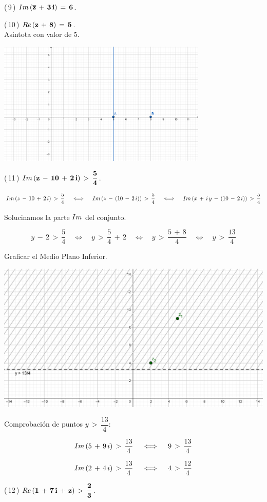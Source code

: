 \documentclass[a4paper,11pt,openany]{book}
\begin{document}
\textcolor{ao(english)}{(\,9\,)} $\bf{\mathnormal{Im}\,(\overline{z}\,+\,3\,i)\,=\,6}$.

\textcolor{ao(english)}{(\,10\,)} $\bf{\mathnormal{Re}\,(z\,+\,8)\,=\,5}$.\\

Asintota con valor de $5$.\\

\begin{center}
    \includegraphics[width=10cm]{Gra-Ej-10.png}
\end{center}

\textcolor{ao(english)}{(\,11\,)} $\bf{\mathnormal{Im}\,(z\,-\,10\,+\,2\,i)\,>\,\dfrac{5}{4}}$.

$$\mathnormal{Im}\,(z\,-\,10\,+\,2\,i)\,>\,\dfrac{5}{4} \quad\iff\quad \mathnormal{Im}\,(z\,-\,(10\,-\,2\,i))\,>\,\dfrac{5}{4} \quad\iff\quad \mathnormal{Im}\,(x\,+\,i\,y\,-\,(10\,-\,2\,i))\,>\,\dfrac{5}{4}$$

\textcolor{ao(english)}{} Solucinamos la parte $\mathnormal{Im}$ del conjunto.

$$y\,-\,2\,>\,\dfrac{5}{4} \quad\iff\quad y\,>\,\dfrac{5}{4}\,+\,2 \quad\iff\quad y\,>\,\dfrac{5\,+\,8}{4} \quad\iff\quad y\,>\,\dfrac{13}{4}$$

\textcolor{ao(english)}{} Graficar el Medio Plano Inferior.

\begin{center}
    \includegraphics[width=15cm]{Gra-Ej-11.png}
\end{center}

\textcolor{ao(english)}{} Comprobación de puntos $y\,>\,\dfrac{13}{4}$:

$$\mathnormal{Im}\,(5\,+\,9\,i)\,>\,\dfrac{13}{4} \quad\iff\quad 9\,>\,\dfrac{13}{4}$$

$$\mathnormal{Im}\,(2\,+\,4\,i)\,>\,\dfrac{13}{4} \quad\iff\quad 4\,>\,\dfrac{12}{4}$$

\textcolor{ao(english)}{(\,12\,)} $\bf{\mathnormal{Re}\,(1\,+\,7\,i\,+\,z)\,>\,\dfrac{2}{3}}$.
\end{document}
